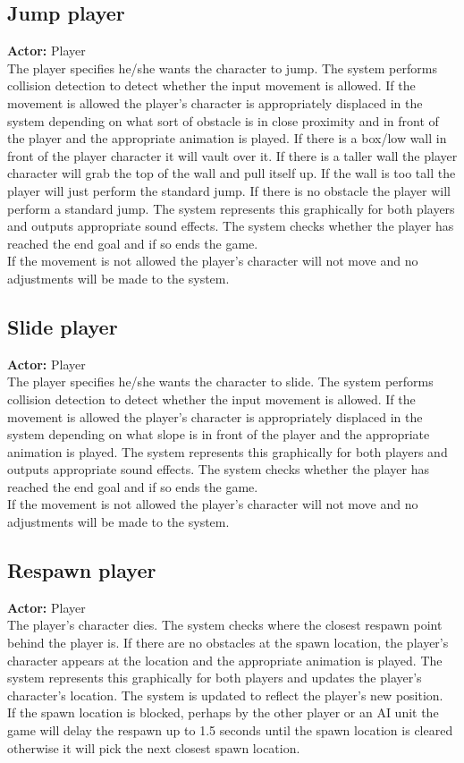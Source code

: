 \documentclass[a4paper,10pt]{article}
\begin{document}
\subsection{Jump player}
\textbf{Actor:} Player\smallskip\\
The player specifies he/she wants the character to jump. The system performs collision detection to detect whether the input movement is allowed. If the movement is allowed the player's character is appropriately displaced in the system depending on what sort of obstacle is in close proximity and in front of the player and the appropriate animation is played. If there is a box/low wall in front of the player character it will vault over it. If there is a taller wall the player character will grab the top of the wall and pull itself up. If the wall is too tall the player will just perform the standard jump. If there is no obstacle the player will perform a standard jump. The system represents this graphically for both players and outputs appropriate sound effects. The system checks whether the player has reached the end goal and if so ends the game.\smallskip\\
If the movement is not allowed the player's character will not move and no adjustments will be made to the system.

\subsection{Slide player}
\textbf{Actor:} Player\smallskip\\
The player specifies he/she wants the character to slide. The system performs collision detection to detect whether the input movement is allowed. If the movement is allowed the player's character is appropriately displaced in the system depending on what slope is in front of the player and the appropriate animation is played. The system represents this graphically for both players and outputs appropriate sound effects. The system checks whether the player has reached the end goal and if so ends the game.\smallskip\\
If the movement is not allowed the player's character will not move and no adjustments will be made to the system.

\subsection{Respawn player}
\textbf{Actor:} Player\smallskip\\
The player's character dies. The system checks where the closest respawn point behind the player is. If there are no obstacles at the spawn location, the player's character appears at the location and the appropriate animation is played. The system represents this graphically for both players and updates the player's character's location.  The system is updated to reflect the player's new position.\smallskip\\
If the spawn location is blocked, perhaps by the other player or an AI unit the game will delay the respawn up to 1.5 seconds until the spawn location is cleared otherwise it will pick the next closest spawn location.
\end{document}
